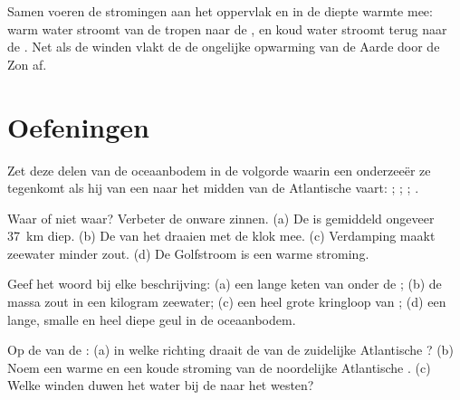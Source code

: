 Samen voeren de stromingen aan het oppervlak en in de diepte warmte mee:
warm water stroomt van de tropen naar de , en koud water stroomt
terug naar de . Net als de winden vlakt de  de ongelijke
opwarming van de Aarde door de Zon af.

\section{Oefeningen}

\begin{exercise}[$\star$]\label{exo:g8:the-oceans:1}
Zet deze delen van de oceaanbodem in de volgorde waarin een onderzeeër ze
tegenkomt als hij van een  naar het midden van de Atlantische 
vaart: ; ; ;
.
\end{exercise}

\begin{exercise}[$\star$]\label{exo:g8:the-oceans:2}
Waar of niet waar? Verbeter de onware zinnen. (a) De  is gemiddeld
ongeveer \qty{37}{km} diep. (b) De  van het 
draaien met de klok mee. (c) Verdamping maakt zeewater minder zout. (d) De
Golfstroom is een warme stroming.
\end{exercise}

\begin{exercise}[$\star$]\label{exo:g8:the-oceans:3}
Geef het woord bij elke beschrijving: (a) een lange keten van  onder
de ; (b) de massa zout in een kilogram zeewater; (c) een heel grote
kringloop van ; (d) een lange, smalle en heel diepe geul in
de oceaanbodem.
\end{exercise}

\begin{exercise}[$\star$]\label{exo:g8:the-oceans:4}
Op de  van de : (a) in welke richting draait de  van de
zuidelijke Atlantische ? (b) Noem een warme en een koude stroming van
de noordelijke Atlantische . (c) Welke winden duwen het water bij de
 naar het westen?
\end{exercise}

